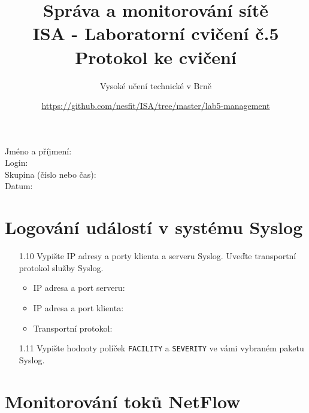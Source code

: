 \documentclass[a4paper,11pt]{article}
\title{Správa a monitorování sítě\\
{\bf\large ISA - Laboratorní cvičení č.5}\\
{\bf\large Protokol ke cvičení}}
\author{Vysoké učení technické v Brně}
\date{\url{https://github.com/nesfit/ISA/tree/master/lab5-management}}
\begin{document}
 

{\let\newpage\relax\maketitle}

Jméno a příjmení:\\
Login:\\
Skupina (číslo nebo čas):\\
Datum:\\

\section{Logování událostí v systému Syslog}

\begin{itemize}
    \item [1.10] Vypište IP adresy a porty klienta a serveru Syslog. Uveďte transportní protokol služby Syslog.
    \begin{itemize}
        \item IP adresa a port serveru:
        \item IP adresa a port klienta:
        \item Transportní protokol: 
    \end{itemize}
    \item [1.11] Vypište hodnoty políček {\tt FACILITY} a {\tt SEVERITY} ve vámi vybraném paketu Syslog.
    \vspace{15mm}
\end{itemize}

\section{Monitorování toků NetFlow}
\end{document}

